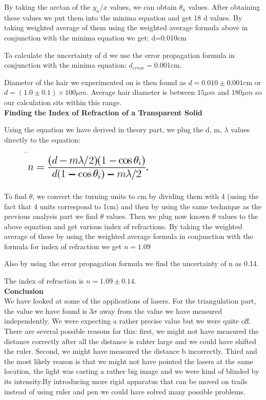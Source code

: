 \documentclass[10pt,a4paper]{article}
\begin{document}
{\begin{figure}[H]
\begin{center}
	\end{center}
\end{figure}
\par By taking the arctan of the $y_n/x$ values, we can obtain $\theta_n$ values. After obtaining these values we put them into the minima equation and get 18 d values. By taking weighted average of them using the weighted average formula above in conjunction with the minima equation we get: d=0.010cm
\par To calculate the uncertainty of d we use the error propagation formula in conjunction with the minima equation: $d_{error}=0.001$cm.
\par Diameter of the hair we experimented on is then found as $d=0.010\pm0.001$cm or $d=(1.0\pm0.1)\times 100\mu m$. Average hair diameter is between $15\mu m$ and $180\mu m$ so our calculation sits within this range.
\\[\baselineskip]
\textbf{\small{Finding the Index of Refraction of a Transparent Solid}}
\par Using the equation we have derived in theory part, we plug the d, m, $\lambda$ values directly to the equation:
\begin{figure}[H]
	\begin{center}
		\includegraphics[scale=0.8]{index.png}
	\end{center}
\end{figure}
\par To find $\theta$, we convert the turning units to cm by dividing them with 4 (using the fact that 4 units correspond to 1cm) and then by using the same technique as the previous analysis part we find $\theta$ values. Then we plug now known $\theta$ values to the above equation and get various index of refractions. By taking the weighted average of these by using the weighted average formula in conjunction with the formula for index of refraction we get $n=1.09$
\par Also by using the error propagation formula we find the uncertainty of n as 0.14.
\par The index of refraction is $n=1.09\pm0.14$.
\\[\baselineskip]
\textbf{Conclusion}\\[\baselineskip]
We have looked at some of the applications of lasers. For the triangulation part, the value we have found is 3$\sigma$ away from the value we have measured independently. We were expecting a rather precise value but we were quite off. There are several possible reasons for this: first, we might not have measured the distance correctly after all the distance is rahter large and we could have shifted the ruler. Second, we might have measured the distance b incorrectly. Third and the most likely reason is that we might not have pointed the lasers at the same location, the light was casting a rather big image and we were kind of blinded by its intensity.By introducing more rigid apparatus that can be moved on trails instead of using ruler and pen we could have solved many possible problems.
}
\end{document}
